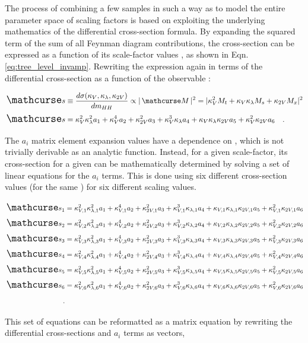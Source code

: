     The process of combining a few samples in such a way as to model the entire parameter space of scaling factors is based on exploiting the underlying mathematics of the differential cross-section formula.
    By expanding the squared term of the sum of all Feynman diagram contributions,
        the cross-section can be expressed as a function of its scale-factor values \cite{ATLAS-CONF-2019-049},
        as shown in Eqn. \ref{eq:tree_level_invamp}.
    Rewriting the expression again in terms of the differential cross-section as a function of the observable \mhh:

    \begin{equation} \begin{split} \label{eq:tree_level_invamp_simple}
        \xsec &\equiv \dXsecM \propto |\invAmp|^2 = |  \kv^2 M_t + \kv \kl M_s + \kvv M_x |^2 \\
        \xsec &= \kv^2 \kl^2 a_1 + \kv^4 a_2 + \kvv^2 a_3 + \kv^3 \kl a_4 + \kv \kl \kvv a_5 + \kv^2 \kvv a_6
        \quad.
    \end{split} \end{equation}

    The $a_i$ matrix element expansion values have a dependence on \mhh, which is not trivially derivable as an analytic function.
    Instead, for a given scale-factor,
        its cross-section for a given \mhh can be mathematically determined by solving a set of linear equations for the $a_i$ terms.
    This is done using six different cross-section values (for the same \mhh) for six different scaling values.

    \newcommand{\crossterm}[1]{
        \xsec_{#1} &= \fkv{#1}^2 \fkl{#1}^2 a_1
            + \fkv{#1}^4 a_2
            + \fkvv{#1}^2 a_3
            + \fkv{#1}^3 \fkl{#1} a_4
            + \fkv{#1} \fkl{#1} \fkvv{#1} a_5
            + \fkv{#1}^2 \fkvv{#1} a_6 \\
    }

    \begin{equation} \label{eq:allsixxsecs} \begin{split}
        \crossterm{1}
        \crossterm{2}
        \crossterm{3}
        \crossterm{4}
        \crossterm{5}
        \crossterm{6}
        \quad.
    \end{split} \end{equation}

    This set of equations can be reformatted as a matrix equation
        by rewriting the differential cross-sections and $a_i$ terms as vectors,

